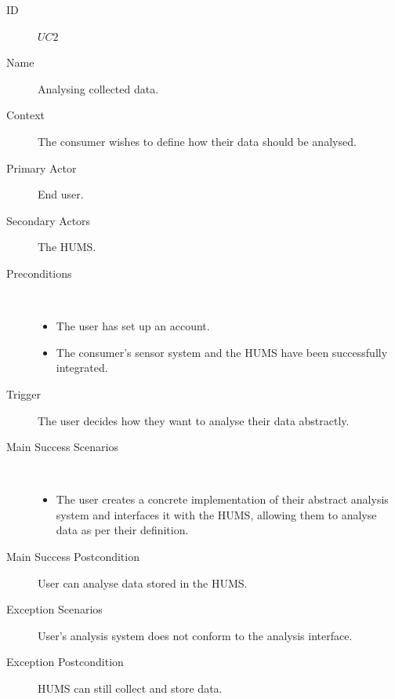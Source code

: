 \documentclass[10pt,a4paper]{article}
\begin{document}
\vspace{\baselineskip}
\begin{description}
	\item[ID] $UC2$
	\item[Name] Analysing collected data.
	\item[Context] The consumer wishes to define how their data should be
	               analysed.
	\item[Primary Actor] End user.
	\item[Secondary Actors] The HUMS.
	\item[Preconditions] ~
			\begin{itemize}
				\item The user has set up an account.
				\item The consumer's sensor system and the HUMS have been
				      successfully integrated.
			\end{itemize}
	\item[Trigger] The user decides how they want to analyse their data
	               abstractly.
	\item[Main Success Scenarios] ~
			\begin{itemize}
				\item The user creates a concrete implementation of their abstract
				      analysis system and interfaces it with the HUMS, allowing them to
				      analyse data as per their definition.
			\end{itemize}
	\item[Main Success Postcondition] User can analyse data stored in the HUMS.
	\item[Exception Scenarios] User's analysis system does not conform to the
			analysis interface.
	\item[Exception Postcondition] HUMS can still collect and store data.
\end{description}

\vspace{\baselineskip}
\end{document}
